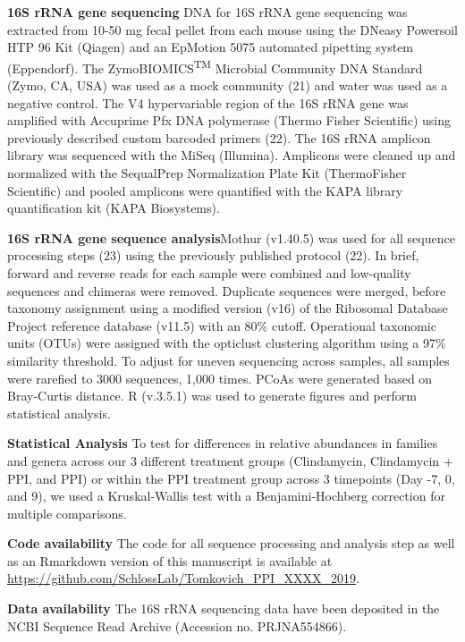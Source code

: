 \documentclass[11pt,]{article}
\begin{document}
\textbf{16S rRNA gene sequencing} DNA for 16S rRNA gene sequencing was
extracted from 10-50 mg fecal pellet from each mouse using the DNeasy
Powersoil HTP 96 Kit (Qiagen) and an EpMotion 5075 automated pipetting
system (Eppendorf). The ZymoBIOMICS\textsuperscript{TM} Microbial
Community DNA Standard (Zymo, CA, USA) was used as a mock community (21)
and water was used as a negative control. The V4 hypervariable region of
the 16S rRNA gene was amplified with Accuprime Pfx DNA polymerase
(Thermo Fisher Scientific) using previously described custom barcoded
primers (22). The 16S rRNA amplicon library was sequenced with the MiSeq
(Illumina). Amplicons were cleaned up and normalized with the SequalPrep
Normalization Plate Kit (ThermoFisher Scientific) and pooled amplicons
were quantified with the KAPA library quantification kit (KAPA
Biosystems).

\textbf{16S rRNA gene sequence analysis}Mothur (v1.40.5) was used for
all sequence processing steps (23) using the previously published
protocol (22). In brief, forward and reverse reads for each sample were
combined and low-quality sequences and chimeras were removed. Duplicate
sequences were merged, before taxonomy assignment using a modified
version (v16) of the Ribosomal Database Project reference database
(v11.5) with an 80\% cutoff. Operational taxonomic units (OTUs) were
assigned with the opticlust clustering algorithm using a 97\% similarity
threshold. To adjust for uneven sequencing across samples, all samples
were rarefied to 3000 sequences, 1,000 times. PCoAs were generated based
on Bray-Curtis distance. R (v.3.5.1) was used to generate figures and
perform statistical analysis.

\textbf{Statistical Analysis} To test for differences in relative
abundances in families and genera across our 3 different treatment
groups (Clindamycin, Clindamycin + PPI, and PPI) or within the PPI
treatment group across 3 timepoints (Day -7, 0, and 9), we used a
Kruskal-Wallis test with a Benjamini-Hochberg correction for multiple
comparisons.

\textbf{Code availability} The code for all sequence processing and
analysis step as well as an Rmarkdown version of this manuscript is
available at
\url{https://github.com/SchlossLab/Tomkovich_PPI_XXXX_2019}.

\textbf{Data availability} The 16S rRNA sequencing data have been
deposited in the NCBI Sequence Read Archive (Accession no. PRJNA554866).

\newpage
\end{document}
